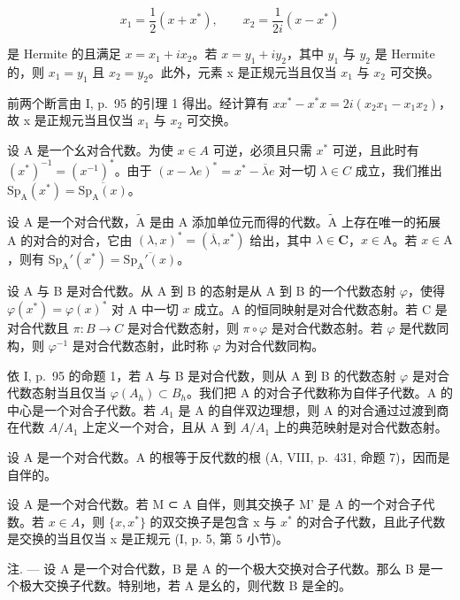 \[
x _ {1} = \frac {1}{2} (x + x ^ {*}), \qquad x _ {2} = \frac {1}{2 i} (x - x ^ {*})
\]

是 Hermite 的且满足 \(x = x_{1} + ix_{2}\)。若 \(x = y_{1} + iy_{2}\)，其中 \(y_{1}\) 与 \(y_{2}\) 是 Hermite 的，则 \(x_{1} = y_{1}\) 且 \(x_{2} = y_{2}\)。此外，元素 x 是正规元当且仅当 \(x_{1}\) 与 \(x_{2}\) 可交换。

前两个断言由 I, p.~95 的引理 1 得出。经计算有 \(xx^{*} - x^{*}x = 2i(x_{2}x_{1} - x_{1}x_{2})\)，故 x 是正规元当且仅当 \(x_{1}\) 与 \(x_{2}\) 可交换。

设 A 是一个幺对合代数。为使 \(x \in A\) 可逆，必须且只需 \(x^{*}\) 可逆，且此时有 \((x^{*})^{-1} = (x^{-1})^{*}\)。由于 \((x - \lambda e)^{*} = x^{*} - \overline{\lambda}e\) 对一切 \(\lambda \in C\) 成立，我们推出 \(\mathrm{Sp}_{\mathrm{A}}(x^{*}) = \overline{\mathrm{Sp}_{\mathrm{A}}(x)}\)。

设 A 是一个对合代数，\(\widetilde{\mathrm{A}}\) 是由 A 添加单位元而得的代数。\(\widetilde{\mathrm{A}}\) 上存在唯一的拓展 A 的对合的对合，它由 \((\lambda, x)^{*} = (\overline{\lambda}, x^{*})\) 给出，其中 \(\lambda \in \mathbf{C}\)，\(x \in \mathrm{A}\)。若 \(x \in \mathrm{A}\)，则有 \(\mathrm{Sp}_{\mathrm{A}}'(x^{*}) = \overline{\mathrm{Sp}_{\mathrm{A}}'(x)}\)。

设 A 与 B 是对合代数。从 A 到 B 的态射是从 A 到 B 的一个代数态射 \(\varphi\)，使得 \(\varphi(x^{*}) = \varphi(x)^{*}\) 对 A 中一切 \(x\) 成立。A 的恒同映射是对合代数态射。若 C 是对合代数且 \(\pi: B \to C\) 是对合代数态射，则 \(\pi \circ \varphi\) 是对合代数态射。若 \(\varphi\) 是代数同构，则 \(\varphi^{-1}\) 是对合代数态射，此时称 \(\varphi\) 为对合代数同构。

依 I, p.~95 的命题 1，若 A 与 B 是对合代数，则从 A 到 B 的代数态射 \(\varphi\) 是对合代数态射当且仅当 \(\varphi(A_h) \subset B_h\)。我们把 A 的对合子代数称为自伴子代数。A 的中心是一个对合子代数。若 \(A_1\) 是 A 的自伴双边理想，则 A 的对合通过过渡到商在代数 \(A/A_1\) 上定义一个对合，且从 A 到 \(A/A_1\) 上的典范映射是对合代数态射。

设 A 是一个对合代数。A 的根等于反代数的根 (A, VIII, p.~431, 命题 7)，因而是自伴的。

设 A 是一个对合代数。若 M ⊂ A 自伴，则其交换子 M' 是 A 的一个对合子代数。若 \(x \in A\)，则 \(\{x, x^{*}\}\) 的双交换子是包含 x 与 \(x^{*}\) 的对合子代数，且此子代数是交换的当且仅当 x 是正规元 (I, p. 5, 第 5 小节)。

注. — 设 A 是一个对合代数，B 是 A 的一个极大交换对合子代数。那么 B 是一个极大交换子代数。特别地，若 A 是幺的，则代数 B 是全的。

